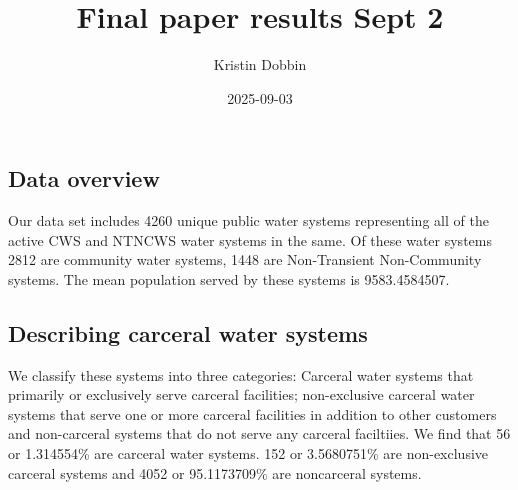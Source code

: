 \documentclass[
]{article}
\title{Final paper results Sept 2}
\author{Kristin Dobbin}
\date{2025-09-03}
\begin{document}
\maketitle

\subsection{Data overview}\label{data-overview}

Our data set includes 4260 unique public water systems representing all
of the active CWS and NTNCWS water systems in the same. Of these water
systems 2812 are community water systems, 1448 are Non-Transient
Non-Community systems. The mean population served by these systems is
9583.4584507.

\subsection{Describing carceral water
systems}\label{describing-carceral-water-systems}

We classify these systems into three categories: Carceral water systems
that primarily or exclusively serve carceral facilities; non-exclusive
carceral water systems that serve one or more carceral facilities in
addition to other customers and non-carceral systems that do not serve
any carceral faciltiies. We find that 56 or 1.314554\% are carceral
water systems. 152 or 3.5680751\% are non-exclusive carceral systems and
4052 or 95.1173709\% are noncarceral systems.
\end{document}
